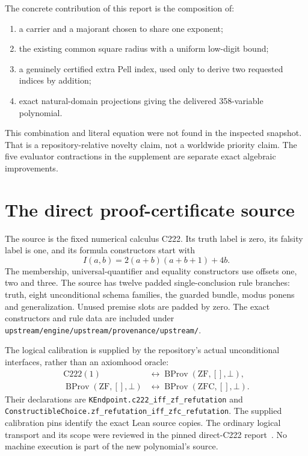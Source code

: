 \documentclass[11pt]{article}
\theoremstyle{definition}\newtheorem{definition}[theorem]{Definition}
\newcommand{\file}[1]{\nolinkurl{#1}}
\begin{document}
The concrete contribution of this report is the composition of:
\begin{enumerate}
\item a carrier and a majorant chosen to share one exponent;
\item the existing common square radius with a uniform low-digit bound;
\item a genuinely certified extra Pell index, used only to derive two
      requested indices by addition;
\item exact natural-domain projections giving the delivered 358-variable
      polynomial.
\end{enumerate}
This combination and literal equation were not found in the inspected
snapshot. That is a repository-relative novelty claim, not a worldwide
priority claim. The five evaluator contractions in the supplement are
separate exact algebraic improvements.

\section{The direct proof-certificate source}
The source is the fixed numerical calculus C222. Its truth label is zero,
its falsity label is one, and its formula constructors start with
\[
 I(a,b)=2(a+b)(a+b+1)+4b.
\]
The membership, universal-quantifier and equality constructors use offsets
one, two and three. The source has twelve padded single-conclusion rule
branches: truth, eight unconditional schema families, the guarded bundle,
modus ponens and generalization. Unused premise slots are padded by zero.
The exact constructors and rule data are included under
\file{upstream/engine/upstream/provenance/upstream/}.

The logical calibration is supplied by the repository's actual
unconditional interfaces, rather than an axiomhood oracle:
\begin{align*}
 \mathrm{C222}(1)&\longleftrightarrow
       \operatorname{BProv}(\mathrm{ZF},[],\bot),\\
 \operatorname{BProv}(\mathrm{ZF},[],\bot)
       &\longleftrightarrow\operatorname{BProv}(\mathrm{ZFC},[],\bot).
\end{align*}
Their declarations are
\file{KEndpoint.c222_iff_zf_refutation} and
\file{ConstructibleChoice.zf_refutation_iff_zfc_refutation}.
The supplied calibration pins identify the exact Lean source copies.
The ordinary logical transport and its scope were reviewed in the pinned
direct-C222 report~\cite{directreview}. No machine execution is part of
the new polynomial's source.
\end{document}
